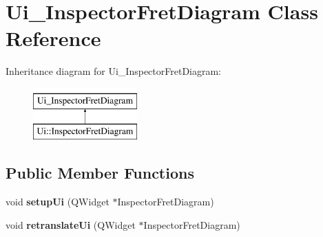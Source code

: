 \hypertarget{class_ui___inspector_fret_diagram}{}\section{Ui\+\_\+\+Inspector\+Fret\+Diagram Class Reference}
\label{class_ui___inspector_fret_diagram}
Inheritance diagram for Ui\+\_\+\+Inspector\+Fret\+Diagram\+:\begin{figure}[H]
\begin{center}
\leavevmode
\includegraphics[height=2.000000cm]{class_ui___inspector_fret_diagram}
\end{center}
\end{figure}
\subsection*{Public Member Functions}
\begin{DoxyCompactItemize}
\item 
\mbox{\label{class_ui___inspector_fret_diagram_a5bcbfb0ba0de74d1fd283de2eefcc994}} 
void {\bfseries setup\+Ui} (Q\+Widget $\ast$Inspector\+Fret\+Diagram)
\item 
\mbox{\label{class_ui___inspector_fret_diagram_a6b4ed14a0f7452e7c42ca804defe4afb}} 
void {\bfseries retranslate\+Ui} (Q\+Widget $\ast$Inspector\+Fret\+Diagram)
\end{DoxyCompactItemize}
